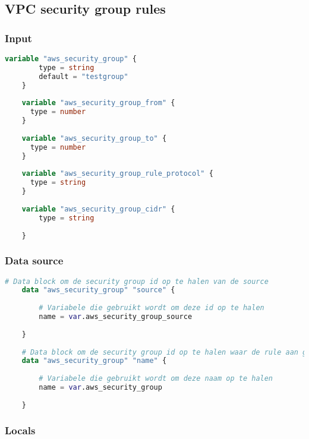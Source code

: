 \subsection{
{VPC security group rules}}
\label{sec:VPC security group regels}

\subsubsection{
{Input}}
\label{sec:Input}

\begin{lstlisting}[language=terraform]
    variable "aws_security_group" {
        type = string
        default = "testgroup"
    }
    
    variable "aws_security_group_from" {
      type = number
    }
    
    variable "aws_security_group_to" {
      type = number
    }
    
    variable "aws_security_group_rule_protocol" {
      type = string
    }
    
    variable "aws_security_group_cidr" {
        type = string
      
    }   
\end{lstlisting}

\subsubsection{
{Data source}}
\label{sec:Data source}

\begin{lstlisting}[language=terraform]
    # Data block om de security group id op te halen van de source
    data "aws_security_group" "source" {
    
        # Variabele die gebruikt wordt om deze id op te halen
        name = var.aws_security_group_source
      
    }
    
    # Data block om de security group id op te halen waar de rule aan gelinkt zal worden
    data "aws_security_group" "name" {
    
        # Variabele die gebruikt wordt om deze naam op te halen
        name = var.aws_security_group
      
    }
\end{lstlisting}

\subsubsection{
{Locals}}
\label{sec:Locals}

